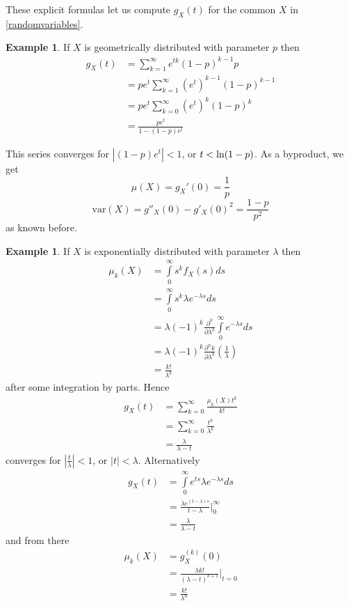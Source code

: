 \documentclass[12pt]{amsart}
\theoremstyle{definition}
\newtheorem{example}[theorem]{Example}
\begin{document}
These explicit formulas let us compute $g_X(t)$ for the common $X$ in \ref{randomvariables}.

\begin{example} If $X$ is geometrically distributed with parameter $p$ then
\begin{align*}
g_X(t) & = \sum\limits_{k=1}^{\infty} e^{t k}(1 - p)^{k-1}p \\
 & = pe^t \sum\limits_{k=1}^{\infty} (e^t)^{k-1}(1 - p)^{k-1} \\
 & = pe^t \sum\limits_{k=0}^{\infty} (e^t)^k(1 - p)^k \\
 & = \frac{pe^t}{1 - (1 - p)e^t}
\end{align*}

This series converges for $|(1 - p)e^t| < 1$, or $t < \textnormal{ln}(1 - p)$. As a byproduct, we get
$$\mu(X) = g_X'(0) = \frac{1}{p}$$
$$\text{var}(X) = g''_X(0) - g'_X(0)^2 = \frac{1 - p}{p^2}$$
as known before.
\end{example}

\begin{example} If $X$ is exponentially distributed with parameter $\lambda$ then
\begin{align*}
\mu_k(X) & = \int\limits_0^{\infty} s^k f_X(s) ds \\
 & = \int\limits_0^{\infty} s^k \lambda e^{- \lambda s} ds \\
 & = \lambda (-1)^k \frac{\partial^k}{\partial \lambda ^k} \int\limits_0^{\infty} e^{-\lambda s} ds \\
 & = \lambda (-1)^k \frac{\partial^nk}{\partial \lambda ^k} \left(\frac{1}{\lambda}\right) \\
 & = \frac{k!}{\lambda^k}
\end{align*}
after some integration by parts. Hence
\begin{align*}
g_X(t) & = \sum\limits_{k=0}^{\infty} \frac{\mu_k(X) t^k}{k!} \\
 & = \sum\limits_{k=0}^{\infty} \frac{t^k}{\lambda^k} \\
 & = \frac{\lambda}{\lambda - t}
\end{align*}
converges for $\left| \frac{t}{\lambda} \right| < 1$, or $|t| < \lambda$. Alternatively
\begin{align*}
g_X(t) & = \int\limits_0^{\infty} e^{ts} \lambda e^{-\lambda s} ds \\
 & = \frac{ \lambda e^{(t - \lambda)s}}{t - \lambda} \rvert_{0}^{\infty} \\
 & = \frac{\lambda}{\lambda - t}
\end{align*}
and from there
\begin{align*}
\mu_k(X) & = g_X^{(k)}(0) \\
 & = \frac{\lambda k!}{(\lambda - t)^{k+1}} \Big|_{t=0} \\
 & = \frac{k!}{\lambda^n}
\end{align*}
\end{example}
\end{document}
